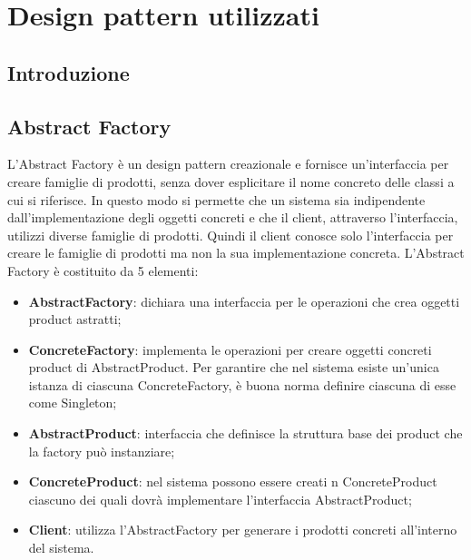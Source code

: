 \newpage
\section{Design pattern utilizzati}

\subsection{Introduzione}

\subsection{Abstract Factory}
L'Abstract Factory è un design pattern creazionale e fornisce un'interfaccia per creare famiglie di prodotti, senza dover esplicitare il nome concreto delle classi a cui si riferisce. In questo modo si permette che un sistema sia indipendente dall'implementazione degli oggetti concreti e che il client, attraverso l'interfaccia, utilizzi diverse famiglie di prodotti. Quindi il client conosce solo l’interfaccia per creare le famiglie di prodotti ma non la sua implementazione concreta.
L’Abstract Factory è costituito da 5 elementi:
\begin{itemize}
	\item \textbf{AbstractFactory}: dichiara una interfaccia per le operazioni che crea oggetti product astratti;
	\item \textbf{ConcreteFactory}: implementa le operazioni per creare oggetti concreti product di AbstractProduct. Per garantire che nel sistema esiste un’unica istanza di ciascuna ConcreteFactory, è buona norma definire ciascuna di esse come Singleton;
	\item \textbf{AbstractProduct}: interfaccia che definisce la struttura base dei product che la factory può instanziare;
	\item \textbf{ConcreteProduct}: nel sistema possono essere creati n ConcreteProduct ciascuno dei quali dovrà implementare l’interfaccia AbstractProduct;
	\item \textbf{Client}: utilizza l’AbstractFactory per generare i prodotti concreti all’interno del sistema.
\end{itemize}

